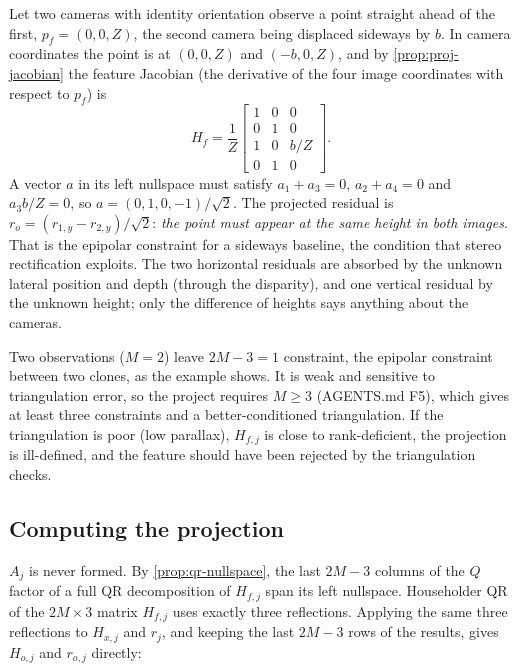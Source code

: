 \begin{worked}
Let two cameras with identity orientation observe a point straight ahead of the first, $p_f = (0, 0, Z)$, the second camera being displaced sideways by $b$. In
camera coordinates the point is at $(0, 0, Z)$ and $(-b, 0, Z)$, and by \cref{prop:proj-jacobian} the feature Jacobian (the derivative of the four image coordinates with
respect to $p_f$) is
\begin{equation*}
  H_f = \frac1Z\begin{bmatrix} 1 & 0 & 0 \\ 0 & 1 & 0 \\ 1 & 0 & b/Z \\ 0 & 1 & 0 \end{bmatrix}.
\end{equation*}
A vector $a$ in its left nullspace must satisfy $a_1 + a_3 = 0$, $a_2 + a_4 = 0$ and $a_3b/Z = 0$, so $a = (0, 1, 0, -1)/\sqrt2$. The projected residual is
$r_o = (r_{1,y} - r_{2,y})/\sqrt2$: \emph{the point must appear at the same height in both images}. That is the epipolar constraint for a sideways baseline, the condition that
stereo rectification exploits. The two horizontal residuals are absorbed by the unknown lateral position and depth (through the disparity), and one vertical
residual by the unknown height; only the difference of heights says anything about the cameras.
\end{worked}

\begin{remark}
Two observations ($M = 2$) leave $2M - 3 = 1$ constraint, the epipolar constraint between two clones, as the example shows. It is weak and
sensitive to triangulation error, so the project requires $M \ge 3$ (AGENTS.md F5), which gives at least three constraints and
a better-conditioned triangulation. If the triangulation is poor (low parallax), $H_{f,j}$ is close to rank-deficient, the
projection is ill-defined, and the feature should have been rejected by the triangulation checks.
\end{remark}

\subsection{Computing the projection}

$A_j$ is never formed. By \cref{prop:qr-nullspace}, the last $2M - 3$ columns of the $Q$ factor of a full QR decomposition of $H_{f,j}$
span its left nullspace. Householder QR of the $2M\times3$ matrix $H_{f,j}$ uses exactly three reflections. Applying the same three
reflections to $H_{x,j}$ and $r_j$, and keeping the last $2M - 3$ rows of the results, gives $H_{o,j}$ and $r_{o,j}$ directly:

